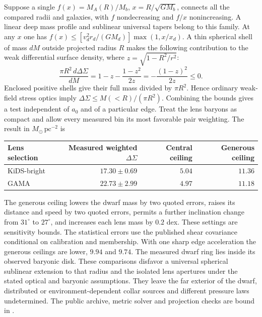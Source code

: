 \documentclass[11pt]{article}
\begin{document}
Suppose a single $f(x)=M_A(R)/M_b$, $x=R/\sqrt{GM_b}$, connects all
the compared radii and galaxies, with $f$ nondecreasing and $f/x$
nonincreasing. A linear deep mass profile and sublinear universal tapers
belong to this family. At any $x$ one has
$f(x)\le[v_d^2r_d/(GM_d)]\max(1,x/x_d)$.
A thin spherical shell of mass $dM$ outside projected radius $R$ makes
the following contribution to the weak differential surface density,
where $z=\sqrt{1-R^2/r^2}$:
\[
 \frac{\pi R^2\,d\Delta\Sigma}{dM}
 =1-z-\frac{1-z^2}{2z}=-\frac{(1-z)^2}{2z}\le0 .
\]
Enclosed positive shells give their full mass divided by $\pi R^2$.
Hence ordinary weak-field stress optics imply
$\Delta\Sigma\le M(<R)/(\pi R^2)$. Combining the bounds gives a
test independent of $a_0$ and of a particular edge. Treat the lens
baryons as compact and allow every measured bin its most favorable
pair weighting. The result in $M_\odot\,\mathrm{pc^{-2}}$ is
\begin{center}
\begin{tabular}{lrrr}
\toprule
Lens selection & Measured weighted $\Delta\Sigma$ & Central ceiling & Generous ceiling\\
\midrule
KiDS-bright & $17.30\pm0.69$ & $5.04$ & $11.36$\\
GAMA & $22.73\pm2.99$ & $4.97$ & $11.18$\\
\bottomrule
\end{tabular}
\end{center}
The generous ceiling lowers the dwarf mass by two quoted errors,
raises its distance and speed by two quoted errors, permits a further
inclination change from $31^\circ$ to $27^\circ$, and increases each
lens mass by $0.2$ dex. These settings are sensitivity bounds. The
statistical errors use the published shear covariance conditional on
calibration and membership. With one sharp edge acceleration the
generous ceilings are lower, $9.94$ and $9.74$. The measured dwarf
ring lies inside its observed baryonic disk. These comparisons
disfavor a universal spherical sublinear extension to that radius and
the isolated lens apertures under the stated optical and baryonic
assumptions. They leave the far exterior of the dwarf, distributed or
environment-dependent collar sources and different pressure laws
undetermined. The public archive, metric solver and projection checks
are bound in .
\end{document}
